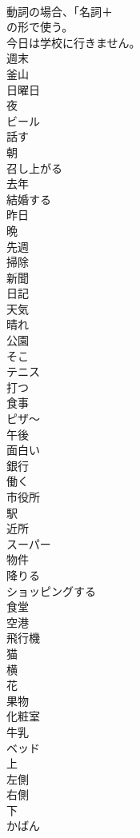 \documentclass[8pt]{extreport}
\begin{document}
\begin{CJK}{UTF8}{min}
\\	動詞の場合、「名詞＋
\\	の形で使う。	
\\	今日は学校に行きません。
\\	週末
\\	釜山
\\	日曜日
\\	夜
\\	ビール
\\	話す
\\	朝
\\	召し上がる
\\	去年
\\	結婚する
\\	昨日
\\	晩
\\	先週
\\	掃除
\\	新聞
\\	日記
\\	天気
\\	晴れ
\\	公園
\\	そこ
\\	テニス
\\	打つ
\\	食事
\\	ピザ～
\\	午後
\\	面白い
\\	銀行
\\	働く
\\	市役所
\\	駅
\\	近所
\\	スーパー
\\	物件
\\	降りる
\\	ショッピングする
\\	食堂
\\	空港
\\	飛行機
\\	猫
\\	横
\\	花
\\	果物
\\	化粧室
\\	牛乳
\\	ベッド
\\	上
\\	左側
\\	右側
\\	下
\\	かばん

\end{CJK}
\end{document}
